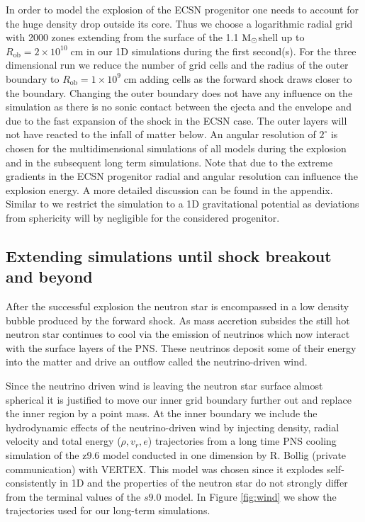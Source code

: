 \documentclass[fleqn,usenatbib]{mnras}
\newcommand{\solm}{\xspace\ensuremath{\rm{M_{\odot}}}}
\newcommand{\vertex}{\textsc{V{\footnotesize ERTEX}}\xspace}
\begin{document}
In order to model the explosion of the ECSN progenitor one needs to account for the huge density drop outside its core. Thus we choose a logarithmic radial grid with 2000 zones extending from the surface of  the 1.1 \solm shell up to $R_{\mathrm{ob}}=2\times 10^{10}\;\mathrm{cm}$ in our 1D simulations during the first second(s). 
For the three dimensional run we reduce the number of grid cells and the radius of the outer boundary to $R_{\mathrm{ob}}=1\times 10^{9}\;\mathrm{cm}$ adding cells as the forward shock draws closer to the boundary.
Changing the outer boundary does not have any influence on the simulation as there is no sonic contact between the ejecta and the envelope and due to the fast expansion of the shock in the ECSN case. The outer layers will not have reacted to the infall of matter below. 
An angular resolution of $2^{\circ}$ is chosen for the multidimensional simulations of all models during the explosion and in the subsequent long term simulations.
Note that due to the extreme gradients in the ECSN progenitor radial and angular resolution can influence the explosion energy. A more detailed discussion can be found in the appendix.
Similar to \cite{Gessner2018} we restrict the simulation to a 1D gravitational potential as deviations from sphericity will by negligible for the considered progenitor.

\subsection{Extending simulations until shock breakout and beyond}

After the successful explosion the neutron star is encompassed in a low density bubble produced by the forward shock. As mass accretion subsides the still hot neutron star continues to cool via the emission of neutrinos which now interact with the surface layers of the PNS.
These neutrinos deposit some of their energy into the matter and drive an outflow called the neutrino-driven wind. 

Since the neutrino driven wind is leaving the neutron star surface almost spherical it is justified to move our inner grid boundary further out and replace the inner region by a point mass. At the inner boundary we include the hydrodynamic effects of the neutrino-driven wind by injecting density, radial velocity and total energy ($\rho,v_r,e$) trajectories from a long time PNS cooling simulation of the z9.6 model conducted in one dimension by R. Bollig (private communication) with \vertex . This model was chosen since it explodes self-consistently in 1D and the properties of the neutron star do not strongly differ from the terminal values of the $s9.0$ model. In Figure \ref{fig:wind} we show the trajectories used for our long-term simulations.
\end{document}
